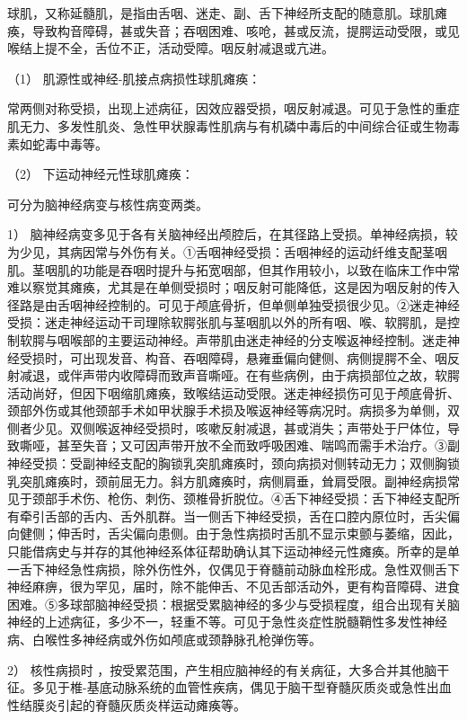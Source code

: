 球肌，又称延髓肌，是指由舌咽、迷走、副、舌下神经所支配的随意肌。球肌瘫痪，导致构音障碍，甚或失音；吞咽困难、咳呛，甚或反流，提腭运动受限，或见喉结上提不全，舌位不正，活动受障。咽反射减退或亢进。

\hypertarget{text00018.htmlux5cux23CHP1-6-2-3-3-1}{}
（1） 肌源性或神经-肌接点病损性球肌瘫痪：

常两侧对称受损，出现上述病征，因效应器受损，咽反射减退。可见于急性的重症肌无力、多发性肌炎、急性甲状腺毒性肌病与有机磷中毒后的中间综合征或生物毒素如蛇毒中毒等。

\hypertarget{text00018.htmlux5cux23CHP1-6-2-3-3-2}{}
（2） 下运动神经元性球肌瘫痪：

可分为脑神经病变与核性病变两类。

1）
脑神经病变多见于各有关脑神经出颅腔后，在其径路上受损。单神经病损，较为少见，其病因常与外伤有关。①舌咽神经受损：舌咽神经的运动纤维支配茎咽肌。茎咽肌的功能是吞咽时提升与拓宽咽部，但其作用较小，以致在临床工作中常难以察觉其瘫痪，尤其是在单侧受损时；咽反射可能降低，这是因为咽反射的传入径路是由舌咽神经控制的。可见于颅底骨折，但单侧单独受损很少见。②迷走神经受损：迷走神经运动干司理除软腭张肌与茎咽肌以外的所有咽、喉、软腭肌，是控制软腭与咽喉部的主要运动神经。声带肌由迷走神经的分支喉返神经控制。迷走神经受损时，可出现发音、构音、吞咽障碍，悬雍垂偏向健侧、病侧提腭不全、咽反射减退，或伴声带内收障碍而致声音嘶哑。在有些病例，由于病损部位之故，软腭活动尚好，但因下咽缩肌瘫痪，致喉结运动受限。迷走神经损伤可见于颅底骨折、颈部外伤或其他颈部手术如甲状腺手术损及喉返神经等病况时。病损多为单侧，双侧者少见。双侧喉返神经受损时，咳嗽反射减退，甚或消失；声带处于尸体位，导致嘶哑，甚至失音；又可因声带开放不全而致呼吸困难、喘鸣而需手术治疗。③副神经受损：受副神经支配的胸锁乳突肌瘫痪时，颈向病损对侧转动无力；双侧胸锁乳突肌瘫痪时，颈前屈无力。斜方肌瘫痪时，病侧肩垂，耸肩受限。副神经病损常见于颈部手术伤、枪伤、刺伤、颈椎骨折脱位。④舌下神经受损：舌下神经支配所有牵引舌部的舌内、舌外肌群。当一侧舌下神经受损，舌在口腔内原位时，舌尖偏向健侧；伸舌时，舌尖偏向患侧。由于急性病损时舌肌不显示束颤与萎缩，因此，只能借病史与并存的其他神经系体征帮助确认其下运动神经元性瘫痪。所幸的是单一舌下神经急性病损，除外伤性外，仅偶见于脊髓前动脉血栓形成。急性双侧舌下神经麻痹，很为罕见，届时，除不能伸舌、不见舌部活动外，更有构音障碍、进食困难。⑤多球部脑神经受损：根据受累脑神经的多少与受损程度，组合出现有关脑神经的上述病征，多少不一，轻重不等。可见于急性炎症性脱髓鞘性多发性神经病、白喉性多神经病或外伤如颅底或颈静脉孔枪弹伤等。

2） 核性病损时
，按受累范围，产生相应脑神经的有关病征，大多合并其他脑干征。多见于椎-基底动脉系统的血管性疾病，偶见于脑干型脊髓灰质炎或急性出血性结膜炎引起的脊髓灰质炎样运动瘫痪等。

